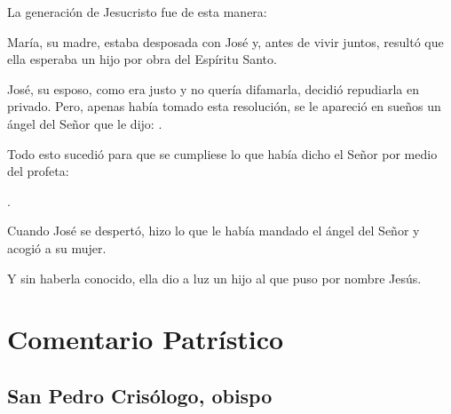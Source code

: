 
 


\begin{scripture}
	La generación de Jesucristo fue de esta manera:
	
	María, su madre, estaba desposada con José y, antes de vivir juntos, resultó que ella esperaba un hijo por obra del Espíritu Santo.
	
	José, su esposo, como era justo y no quería difamarla, decidió repudiarla en privado. Pero, apenas había tomado esta resolución, se le apareció en sueños un ángel del Señor que le dijo: .
	
	Todo esto sucedió para que se cumpliese lo que había dicho el Señor por medio del profeta:
	
	.
	
	Cuando José se despertó, hizo lo que le había mandado el ángel del Señor y acogió a su mujer.
	
	Y sin haberla conocido, ella dio a luz un hijo al que puso por nombre Jesús.
\end{scripture}

\newsection

\section{Comentario Patrístico}

\subsection{San Pedro Crisólogo, obispo}



